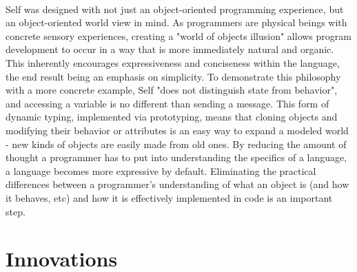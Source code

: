 \documentclass[12pt]{article}
\begin{document}
\paragraph{} Self was designed with not just an object-oriented programming experience, but an object-oriented world view in mind. As programmers are physical beings with concrete sensory experiences, creating a "world of objects illusion" \cite{experience} allows program development to occur in a way that is more immediately natural and organic. This inherently encourages expressiveness and conciseness within the language, the end result being an emphasis on simplicity. To demonstrate this philosophy with a more concrete example, Self "does not distinguish state from behavior"\cite{self}, and accessing a variable is no different than sending a message. This form of dynamic typing, implemented via prototyping, means that cloning objects and modifying their behavior or attributes is an easy way to expand a modeled world - new kinds of objects are easily made from old ones. By reducing the amount of thought a programmer has to put into understanding the specifics of a language, a language becomes more expressive by default. Eliminating the practical differences between a programmer's understanding of what an object is (and how it behaves, etc) and how it is effectively implemented in code is an important step. 

\section{Innovations}
\end{document}
